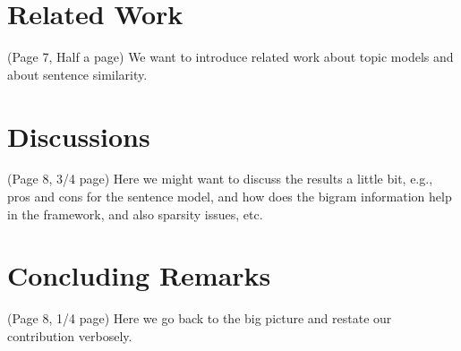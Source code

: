 \section{Related Work} { \color{red} (Page 7, Half a page)  We want to introduce related work
about topic models and about sentence similarity. }

\section{Discussions} { \color{red} (Page 8, 3/4 page)  Here we might want to discuss the
results a little bit, e.g., pros and cons for the sentence model, and how does
the bigram information help in the framework, and also sparsity issues, etc. }

\section{Concluding Remarks} { \color{red} (Page 8, 1/4 page)
Here we go back to the big picture and restate our contribution verbosely.  }

